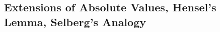 \newpage
\subsection{Extensions of Absolute Values, Hensel's Lemma, Selberg's Analogy\label{sec:620_15}}